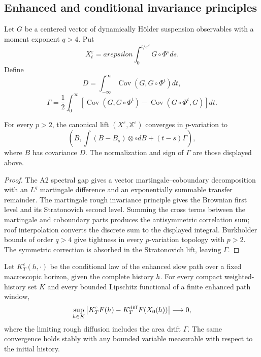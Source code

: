 \subsection{Enhanced and conditional invariance principles}

Let \(G\) be a centered vector of dynamically Hölder suspension observables
with a moment exponent \(q>4\).  Put
\[
X_t^\varepsilon=arepsilon
\int_0^{t/\varepsilon^2}G\circ\Phi^sds.
\]
Define
\[
D=\int_{-\infty}^{\infty}
\operatorname{Cov}(G,G\circ\Phi^t)dt,
\]
\[
\Gamma=\frac12\int_0^\infty
\left[
\operatorname{Cov}(G,G\circ\Phi^t)
-\operatorname{Cov}(G\circ\Phi^t,G)
\right]dt.
\]

\begin{theorem}
\label{thm:r6-a4-rough}
For every \(p>2\), the canonical lift
\((X^\varepsilon,\mathbb X^\varepsilon)\) converges in
\(p\)-variation to
\[
\left(B,
\int(B-B_s)\otimes\circ dB+(t-s)\Gamma
\right),
\]
where \(B\) has covariance \(D\).  The normalization and sign of
\(\Gamma\) are those displayed above.
\end{theorem}

\begin{proof}
The A2 spectral gap gives a vector martingale--coboundary decomposition with
an \(L^q\) martingale difference and an exponentially summable transfer
remainder.  The martingale rough invariance principle gives the Brownian first
level and its Stratonovich second level.  Summing the cross terms between the
martingale and coboundary parts produces the antisymmetric correlation sum;
roof interpolation converts the discrete sum to the displayed integral.
Burkholder bounds of order \(q>4\) give tightness in every
\(p\)-variation topology with \(p>2\).  The symmetric correction is absorbed
in the Stratonovich lift, leaving \(\Gamma\).
\end{proof}

\begin{theorem}
\label{thm:r6-a4-conditional}
Let \(K_T^\varepsilon(h,\cdot)\) be the conditional law of the enhanced slow
path over a fixed macroscopic horizon, given the complete history \(h\).
For every compact weighted-history set \(K\) and every bounded Lipschitz
functional of a finite enhanced path window,
\[
\sup_{h\in K}
\left|K_T^\varepsilon F(h)-K_T^{\rm diff}F(X_0(h))\right|
\longrightarrow0,
\]
where the limiting rough diffusion includes the area drift \(\Gamma\).  The
same convergence holds stably with any bounded variable measurable with
respect to the initial history.
\end{theorem}

